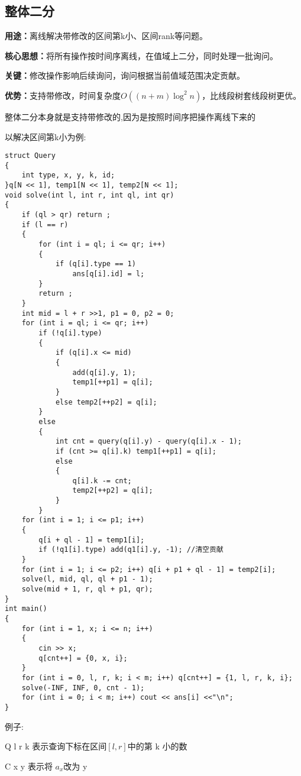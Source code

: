 \documentclass[a4paper, fontset=none]{ctexart}
\begin{document}
\subsection{整体二分}
\textbf{用途：}离线解决带修改的区间第k小、区间rank等问题。

\textbf{核心思想：}将所有操作按时间序离线，在值域上二分，同时处理一批询问。

\textbf{关键：}修改操作影响后续询问，询问根据当前值域范围决定贡献。

\textbf{优势：}支持带修改，时间复杂度$O((n+m)\log ^ 2 n)$，比线段树套线段树更优。

整体二分本身就是支持带修改的,因为是按照时间序把操作离线下来的

以解决区间第k小为例:
\begin{verbatim}
struct Query
{
    int type, x, y, k, id;
}q[N << 1], temp1[N << 1], temp2[N << 1];
void solve(int l, int r, int ql, int qr)
{
    if (ql > qr) return ;
    if (l == r)
    {
        for (int i = ql; i <= qr; i++)
        {
            if (q[i].type == 1)
                ans[q[i].id] = l;
        }
        return ;
    }
    int mid = l + r >>1, p1 = 0, p2 = 0;
    for (int i = ql; i <= qr; i++)
        if (!q[i].type)
        {
            if (q[i].x <= mid)
            {
                add(q[i].y, 1);
                temp1[++p1] = q[i];
            }
            else temp2[++p2] = q[i];
        }
        else
        {
            int cnt = query(q[i].y) - query(q[i].x - 1);
            if (cnt >= q[i].k) temp1[++p1] = q[i];
            else
            {
                q[i].k -= cnt;
                temp2[++p2] = q[i];
            }
        }
    for (int i = 1; i <= p1; i++)
    {
        q[i + ql - 1] = temp1[i];
        if (!q1[i].type) add(q1[i].y, -1); //清空贡献
    }
    for (int i = 1; i <= p2; i++) q[i + p1 + ql - 1] = temp2[i];
    solve(l, mid, ql, ql + p1 - 1);
    solve(mid + 1, r, ql + p1, qr);
}
int main()
{
    for (int i = 1, x; i <= n; i++)
    {
        cin >> x;
        q[cnt++] = {0, x, i};
    }
    for (int i = 0, l, r, k; i < m; i++) q[cnt++] = {1, l, r, k, i};
    solve(-INF, INF, 0, cnt - 1);
    for (int i = 0; i < m; i++) cout << ans[i] <<"\n";
}
\end{verbatim}
例子:

Q l r k 表示查询下标在区间$[l, r]$中的第 k 小的数

C x y 表示将 $a_x$改为 y
\end{document}
